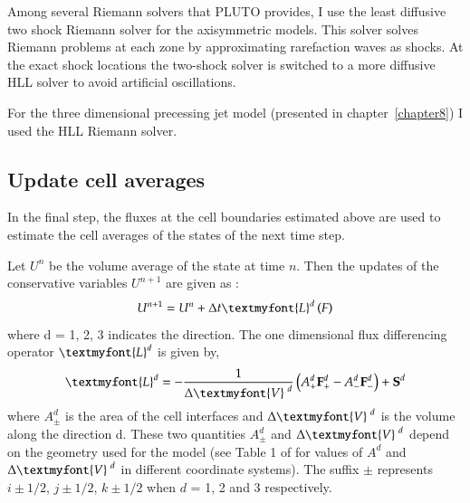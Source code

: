 Among several Riemann solvers that PLUTO provides, I use the least diffusive two shock Riemann solver \citep{mignone05} for the axisymmetric models. This solver solves Riemann problems at each zone by approximating rarefaction waves as shocks. 
At the exact shock locations the two-shock solver is switched to a more diffusive HLL solver to avoid artificial oscillations.

For the three dimensional precessing jet model (presented in chapter~\ref{chapter8}) I used the HLL Riemann solver. 





\subsection{Update cell averages}

In the final step, the fluxes at the cell boundaries estimated above are used to estimate the cell averages of the states of the next time step.


Let $U^n$ be the volume average of the state at time $n$. Then the updates of the conservative variables $U^{n+1}$ are given as \citep{mignone07}: 
\begin{equation}
U^{n+1} = U^n + \Delta t \textmyfont{L}^d\left ( F \right )
\label{eq:upd}
\end{equation}
where d = 1, 2, 3 indicates the direction. The one dimensional flux differencing operator $\textmyfont{L}^d$ is given by,
\begin{equation}
\textmyfont{L}^d = - \frac{1}{\Delta \textmyfont{V}^{\ d}}\left ( A_+^d\textbf{F}_+^d - A_-^d\textbf{F}_-^d\right ) + \textbf{S}^d
\label{ea:up}
\end{equation}
where $A_{\pm}^d$ is the area of the cell interfaces and $\Delta \textmyfont{V}^{\ d}$ is the volume along the direction d. These two quantities $A_{\pm}^d$ and $\Delta \textmyfont{V}^{\ d}$ depend on the geometry used for the model (see Table 1 of \citep{mignone07} for values of $A^d$ and $\Delta \textmyfont{V}^{\ d}$ in different coordinate systems). The suffix $\pm$ represents $i\pm1/2$, $j\pm1/2$, $k\pm1/2$ when $d$ = 1, 2 and 3 respectively.  

